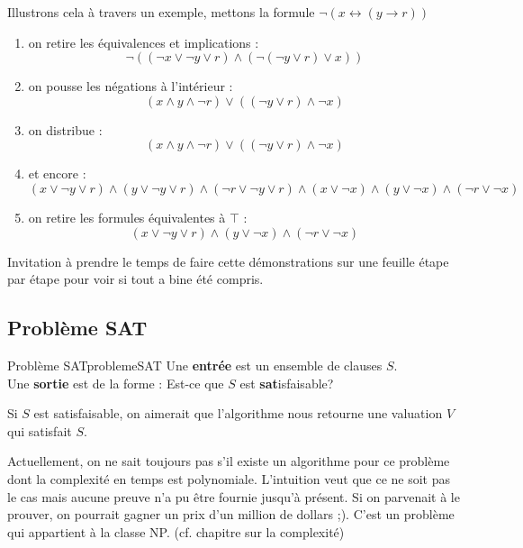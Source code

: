 \begin{example}
    Illustrons cela à travers un exemple, mettons la formule $\neg(x\leftrightarrow(y\rightarrow r))$
    \begin{enumerate}
        \item on retire les équivalences et implications :
        \begin{equation*}
            \neg((\neg x\vee\neg y \vee r)\wedge(\neg(\neg y\vee r)\vee x))
        \end{equation*}
        \item on pousse les négations à l'intérieur :
        \begin{equation*}
            (x\wedge y\wedge\neg r) \vee ((\neg y\vee r)\wedge\neg x)
        \end{equation*}
        \item on distribue : 
        \begin{equation*}
            (x\wedge y\wedge\neg r)\vee((\neg y\vee r)\wedge\neg x)
        \end{equation*}
        \item et encore : 
        \begin{equation*}
            (x\vee\neg y\vee r)\wedge(y\vee\neg y\vee r)\wedge(\neg r\vee\neg y\vee r)\wedge(x\vee\neg x)\wedge(y\vee\neg x)\wedge(\neg r\vee\neg x)
        \end{equation*}
        \item on retire les formules équivalentes à $\top$ :
        \begin{equation*}
            (x\vee\neg y\vee r)\wedge(y\vee\neg x)\wedge(\neg r\vee\neg x)
        \end{equation*}
    \end{enumerate}
    Invitation à prendre le temps de faire cette démonstrations sur une feuille étape par étape pour voir si tout a bine été compris.
\end{example}

\subsection{Problème SAT}
\begin{definition}{Problème SAT}{problemeSAT}
    Une \textbf{entrée} est un ensemble de clauses $S$. \\
    Une \textbf{sortie} est de la forme : Est-ce que $S$ est \textbf{sat}isfaisable?
\end{definition}
Si $S$ est satisfaisable, on aimerait que l'algorithme nous retourne une valuation $V$ qui satisfait $S$.
\begin{remark}
    Actuellement, on ne sait toujours pas s'il existe un algorithme pour ce problème dont la complexité en temps est polynomiale. L'intuition veut que ce ne soit pas le cas mais aucune preuve n'a pu être fournie jusqu'à présent. Si on parvenait à le prouver, on pourrait gagner un prix d'un million de dollars ;). C'est un problème qui appartient à la classe NP. (cf. chapitre sur la complexité) 
\end{remark}

